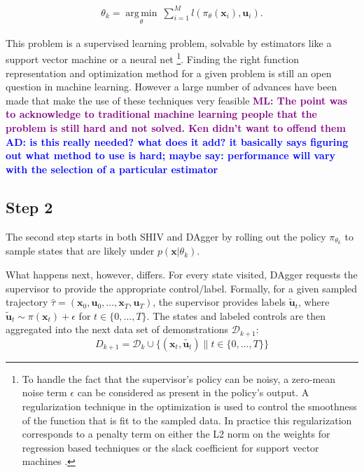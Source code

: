 \documentclass[10pt, conference]{ieeeconf}      %
\DeclareMathOperator*{\argmin}{arg\,min}
\newcommand{\bu}{\mathbf{u}}
\newcommand{\bx}{\mathbf{x}}
\newcommand{\adnote}[1]{\ifthenelse{\boolean{include-notes}}%
 {\textcolor{blue}{\textbf{AD: #1}}}{}}
\newcommand{\fpnote}[1]{\ifthenelse{\boolean{include-notes}}%
 {\textcolor{blue}{\textbf{FP: #1}}}{}}
\newcommand{\mlnote}[1]{\ifthenelse{\boolean{include-notes}}%
 {\textcolor{purple}{\textbf{ML: #1}}}{}}
\begin{document}
 \vspace{-2ex}
\begin{align}\label{eq:super_objj}
\theta_{k} = \underset{\theta}{\argmin} \: \sum_{i=1}^{M} l(\pi_{\theta}(\bx_i),\bu_i).
\end{align}


This problem is a supervised learning problem, solvable by estimators like a support vector machine or a neural net \footnote{To handle the fact that the supervisor's policy can be noisy, a zero-mean noise term $\epsilon$ 
can be considered as present in the policy's output.  A regularization technique in the optimization is
used to control the smoothness of the function that is fit to the sampled data. In practice this regularization corresponds to a penalty term on either the L2 norm on the weights for regression based techniques or the slack coefficient for support vector machines \cite{scholkopf2002learning}.}.  Finding the right function representation and optimization method for a given problem is still an open question in machine learning. However a large number of advances have been made that make the use of these techniques very feasible \cite{scholkopf2002learning} \mlnote{The point was to acknowledge to traditional machine learning people that the problem is still hard and not solved. Ken didn't want to offend them}\adnote{is this really needed? what does it add? it basically says figuring out what method to use is hard; maybe say: performance will vary with the selection of a particular estimator \cite{}}
 

 \subsection{Step 2}
The second step starts in both SHIV and DAgger by rolling out the policy $\pi_{\theta_{k}}$ to sample states that are likely under $p(\bx|\theta_{k})$. 

What happens next, however, differs. For every state visited, DAgger requests the supervisor to provide the appropriate control/label. Formally, for a given sampled trajectory  $\hat{\tau} = (\bx_0,\bu_0,...,\bx_T,\bu_T )$, the supervisor provides labels $\tilde{\bu}_t$, where $\tilde{\bu}_t \sim \pi(\bx_t) + \epsilon$ for $t\in \{0, \ldots, T\}$.
The states and labeled controls are then aggregated into the next data set of demonstrations $\mathcal{D}_{k+1}$:
$$D_{k+1}=\mathcal{D}_k \cup \{(\bx_t,\tilde{\bu_t})\|t\in\{0,\ldots,T\}\} $$
\end{document}

